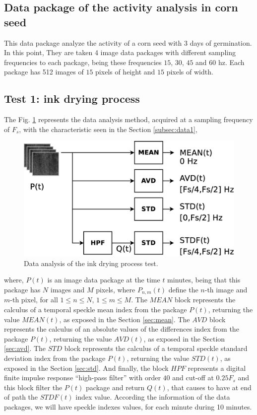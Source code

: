 \documentclass[review]{elsarticle}
\begin{document}
\subsection{Data package of the activity analysis in corn seed}
\label{subsec:data2}
 This data package analyze the activity of a corn seed with 3 days of germination. 
 In this point, 
 They are taken 4 image data packages with different sampling frequencies to each package,
 being these frequencies $15$, $30$, $45$ and $60$ hz.
 Each package has 512 images of $15$ pixels of height and $15$ pixels of width.
 

\subsection{Test 1: ink drying process}
\label{subsec:test1}
The Fig. \ref{fig:test1} represents the data analysis method, acquired at a 
sampling frequency of $F_s$, 
with the characteristic seen in the Section \ref{subsec:data1},
\begin{figure}[ht!]
\centering
\includegraphics[width=0.55\columnwidth]{test1.eps}
\caption{Data analysis of the ink drying process test.}
\label{fig:test1}
\end{figure}
where, $P(t)$ is an image data package at the time $t$ minutes, 
being that this package has $N$ images and $M$ pixels, where $P_{n,m}(t)$ 
define the $n$-th image and $m$-th pixel, for all $1 \leq n \leq N$, $1 \leq m \leq M$.
The $MEAN$ block represents the calculus of a temporal speckle mean index from 
the package $P(t)$, returning the value $MEAN(t)$, as exposed in the Section \ref{sec:mean}. 
The $AVD$ block represents the calculus of an absolute values of the differences index from 
the package $P(t)$, returning the value $AVD(t)$, as exposed in the Section \ref{sec:avd}. 
The $STD$ block represents the calculus of a temporal speckle standard deviation index from 
the package $P(t)$, returning the value $STD(t)$, as exposed in the Section \ref{sec:std}.
And finally,
the block $HPF$ represents a digital finite impulse response ``high-pass filter'' 
with order $40$ and cut-off at $0.25F_s$ and this block filter the $P(t)$ package and return $Q(t)$,
that causes to have at end of path the $STDF(t)$ index value.
According the information of the data packages, 
we will have speckle indexes values, for each minute during 10 minutes.
\end{document}
